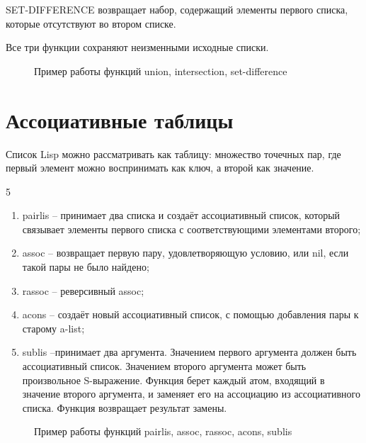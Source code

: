 SET-DIFFERENCE возвращает набор, содержащий элементы первого списка, 
которые отсутствуют во втором списке.

Все три функции сохраняют неизменными исходные списки.

\begin{figure}[H]
    \begin{listingbox}{}
        
    \end{listingbox}
    \caption{Пример работы функций union, intersection, set-difference}
    \label{lst:union-intersection-set-difference-example}
\end{figure}

\section{Ассоциативные таблицы}

Список Lisp можно рассматривать как таблицу: множество точечных пар,
где первый элемент можно воспринимать как ключ, а второй как значение.

\begin{listbox}{\noindent \begin{listboxtitle}{}5\end{listboxtitle} 
	}
\begin{enumerate}
	\item pairlis -- принимает два списка и создаёт ассоциативный список, 
    который связывает элементы первого списка с соответствующими 
    элементами второго;
	\item assoc -- возвращает первую пару, удовлетворяющую условию, или nil, 
    если такой пары не было найдено;
	\item rassoc -- реверсивный assoc;
	\item acons -- создаёт новый ассоциативный список, с помощью добавления 
    пары к старому a-list;
	\item sublis --принимает два аргумента. Значением первого аргумента 
    должен быть ассоциативный список. Значением второго 
    аргумента может быть произвольное S-выражение. Функция берет каждый 
    атом, входящий в значение второго аргумента, и заменяет его на 
    ассоциацию из ассоциативного списка. Функция возвращает результат замены.
\end{enumerate}
\end{listbox}

\begin{figure}[H]
    \begin{listingbox}{}
        
    \end{listingbox}
    \caption{Пример работы функций pairlis, assoc, rassoc, acons, sublis}
    \label{lst:pairlis-assoc-rassoc-acons-sublis-example}
\end{figure}